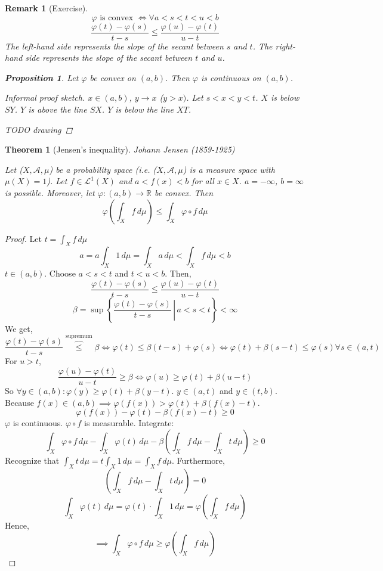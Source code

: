 \documentclass{article}
\newtheorem{theorem}{Theorem}  \numberwithin{theorem}{section}
\newtheorem{remark}{Remark}  \numberwithin{remark}{section}
\newtheorem{proposition}{Proposition}  \numberwithin{proposition}{section}
\newcommand{\setdef}[2]{\left\{\left.#1\,\right|\,#2\right\}}
\begin{document}
\begin{remark}[Exercise]
  \[ \varphi \text{ is convex } \iff \forall a < s < t < u < b \]
  \[ \frac{\varphi(t) - \varphi(s)}{t - s} \leq \frac{\varphi(u) - \varphi(t)}{u - t} \]
  The left-hand side represents the slope of the secant between $s$ and $t$.
  The right-hand side represents the slope of the secant between $t$ and $u$.

  \begin{proposition}
    Let $\varphi$ be convex on $(a, b)$. Then $\varphi$ is continuous on $(a,b)$.
  \end{proposition}
  \begin{proof}[Informal proof sketch]
    $x \in (a,b)$, $y \to x$ ($y > x)$.
    Let $s < x < y < t$.
    $X$ is below $SY$. $Y$ is above the line $SX$. $Y$ is below the line $XT$.

    TODO drawing
  \end{proof}
\end{remark}

\begin{theorem}[Jensen's inequality] %
  Johann Jensen (1859-1925)

  Let ($X, \mathcal A, \mu$) be a probability space (i.e. ($X, \mathcal A, \mu$) is a measure space with $\mu(X) = 1$).
  Let $f \in \mathcal L^1(X)$ and $a < f(x) < b$ for all $x \in X$.
  $a = -\infty$, $b = \infty$ is possible. Moreover, let $\varphi: (a,b) \to \mathbb R$ be convex.
  Then
  \[ \varphi\left(\int_X f \, d\mu\right) \leq \int_X \varphi \circ f \, d\mu \]
\end{theorem}

\begin{proof}
  Let $t = \int_X f \, d\mu$
  \[ a = a \int_X 1 \, d\mu = \int_X a \, d\mu < \int_X f \, d\mu < b \]
  $t \in (a,b)$. Choose $a < s < t$ and $t < u < b$. Then,
  \[ \frac{\varphi(t) - \varphi(s)}{t - s} \leq \frac{\varphi(u) - \varphi(t)}{u-t} \]
  \[ \beta = \sup\setdef{\frac{\varphi(t) - \varphi(s)}{t - s}}{a < s < t} < \infty \]
  We get,
  \[
    \frac{\varphi(t) - \varphi(s)}{t - s} \overbrace{\leq}^{\text{supremum}} \beta
    \iff \varphi(t) \leq \beta(t-s) + \varphi(s)
    \iff \varphi(t) + \beta(s - t) \leq \varphi(s)
    \forall s \in (a,t)
  \]
  For $u > t$,
  \[ \frac{\varphi(u) - \varphi(t)}{u - t} \geq \beta \iff \varphi(u) \geq \varphi(t) + \beta(u - t) \]
  So $\forall y \in (a,b): \varphi(y) \geq \varphi(t) + \beta(y - t)$.
  $y \in (a,t)$ and $y \in (t,b)$.
  Because $f(x) \in (a,b) \implies \varphi(f(x)) > \varphi(t) + \beta(f(x) - t)$.
  \[ \varphi(f(x)) - \varphi(t) - \beta(f(x) - t) \geq 0 \]
  $\varphi$ is continuous. $\varphi \circ f$ is measurable. Integrate:
  \[ \int_X \varphi \circ f \, d\mu - \int_X \varphi(t) \, d\mu - \beta \left(\int_X f \, d\mu - \int_X t \, d\mu\right) \geq 0 \]
  Recognize that $\int_X t \, d\mu = t \int_X 1 \, d\mu = \int_X f \, d\mu$. Furthermore,
  \[ \left(\int_X f \, d\mu - \int_X t \, d\mu\right) = 0 \]
  \[ \int_X \varphi(t) \, d\mu = \varphi(t) \cdot \int_X 1 \, d\mu = \varphi(\int_X f \, d\mu) \]
  Hence,
  \[ \implies \int_X \varphi \circ f \, d\mu \geq \varphi(\int_X f \, d\mu) \]
\end{proof}
\end{document}
